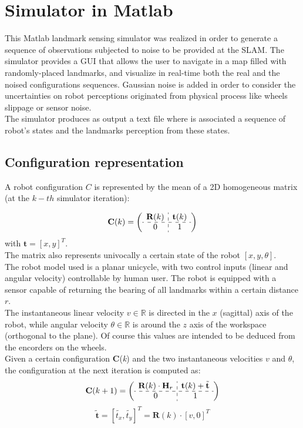\section{Simulator in Matlab}\label{sec:matlab_simulator}

This Matlab landmark sensing simulator was realized in order to generate a sequence of observations subjected to noise to be provided at the SLAM.
The simulator provides a GUI that allows the user to navigate in a map filled with randomly-placed landmarks, and visualize in real-time both the real 
and the noised configurations sequences. Gaussian noise is added in order to consider the uncertainties on robot perceptions originated from physical process
like wheels slippage or sensor noise.\\
The simulator produces as output a text file where is associated a sequence of robot's states and the landmarks perception from these states.

\subsection{Configuration representation}
A robot configuration $C$ is represented by the mean of a 2D homogeneous matrix (at the $k-th$ simulator iteration):

\[ 
\textbf{C}(k) = 
\left( \begin{array}{c:c}
  \textbf{R}(k)  & \textbf{t}(k) \\ \hdashline
  0 & 1  \\
\end{array} \right)
\]
with $\textbf{t} = [x,y]^T$.\\
The matrix also represents univocally a certain state of the robot $[x,y,\theta]$.
\\
The robot model used is a planar unicycle, with two control inputs (linear and angular velocity) controllable by human user.
The robot is equipped with a sensor capable of returning the bearing of all landmarks within a certain distance $r$.\\
The instantaneous linear velocity $v \in \mathbb{R}$ is directed in the $x$ (sagittal) axis of the robot, while angular velocity $\theta \in \mathbb{R}$ is
around the $z$ axis of the workspace (orthogonal to the plane). Of course this values are intended to be deduced from the encorders on the wheels.\\
Given a certain configuration $\textbf{C}$(\textit{k}) and the two instantaneous velocities $v$ and $\theta$, the configuration at the next iteration is computed as:\\
\vspace{1 cm}
\[ 
\textbf{C}(k+1) = 
\left( \begin{array}{c:c}
  \textbf{R}(k) \cdot \textbf{H}_r & \textbf{t}(k) + \tilde{\textbf{t}} \\ \hdashline
  0 & 1  \\
\end{array} \right)
\]
\[ 
\tilde{\textbf{t}} = [\tilde{t_x},\tilde{t_y}]^T = \textbf{R}(k) \cdot [v,0]^T
\]


